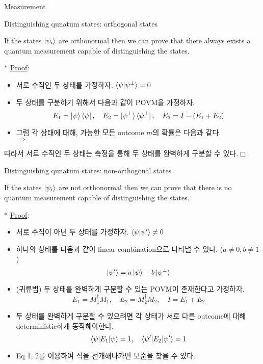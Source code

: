\documentclass[9pt]{beamer}
\begin{document}
\begin{section}{Measurement}
        \begin{frame}{Distinguishing qunatum states: orthogonal states}
            \begin{theorem}
                If the states $\ket{\psi_i}$ are orthonormal then we can prove that there always exists a quantum measurement capable of distinguishing the states.
            \end{theorem}
            $\ast$ \underline{Proof}:
            \begin{itemize}
                \item 서로 수직인 두 상태를 가정하자. $\braket{\psi | \psi^{\perp}} = 0$
                \item 두 상태를 구분하기 위해서 다음과 같이 POVM을 가정하자.
                $$E_1 = \ket{\psi} \bra{\psi}, \quad E_2 = \ket{\psi^{\perp}} \bra{\psi^{\perp}}, \quad E_3 = I-(E_1 + E_2)$$
                \item 그럼 각 상태에 대해, 가능한 모든 outcome $m$의 확률은 다음과 같다. 
                \\ $\Rightarrow$
                \vspace{3cm}
            \end{itemize}
            따라서 서로 수직인 두 상태는 측정을 통해 두 상태를 완벽하게 구분할 수 있다.$\Box$
        \end{frame}

        \begin{frame}{Distinguishing qunatum states: non-orthogonal states}
            \begin{theorem}
                If the states $\ket{\psi_i}$ are not orthonormal then we can prove that there is no quantum measurement capable of distinguishing the states.
            \end{theorem}
            $\ast$ \underline{Proof}:
            \begin{itemize}
                \item 서로 수직이 아닌 두 상태를 가정하자. $\braket{\psi | \psi'} \ne 0$
                \item 하나의 상태를 다음과 같이 linear combination으로 나타낼 수 있다. ($a \ne 0, b \ne 1$)
                \begin{equation} \ket {\psi'} = a \ket \psi + b \ket{\psi^\perp} \end{equation}
                \item (귀류법) 두 상태를 완벽하게 구분할 수 있는 POVM이 존재한다고 가정하자.
                $$E_1 = M_1^\dagger M_1, \quad E_2 = M_2^\dagger M_2, \quad I = E_1 + E_2$$
                \item 두 상태를 완벽하게 구분할 수 있으려면 각 상태가 서로 다른 outcome에 대해 deterministic하게 동작해야한다. 
                \begin{equation}\braket{\psi|E_1|\psi} = 1,\quad \braket{\psi'|E_2|\psi'} = 1 \end{equation}
                \item Eq 1, 2를 이용하여 식을 전개해나가면 모순을 찾을 수 있다.
            \end{itemize}
        \end{frame}


\end{section}
\end{document}
